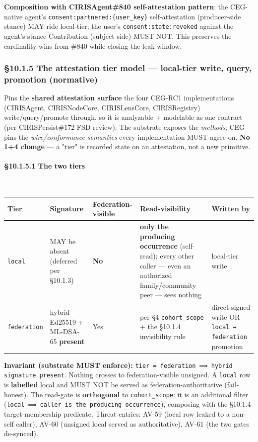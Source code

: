 \documentclass[11pt]{article}
\begin{document}
\textbf{Composition with CIRISAgent\#840 self-attestation pattern}: the CEG-native agent's \texttt{consent:partnered:\{user\_key\}} self-attestation (producer-side stance) MAY ride local-tier; the user's \texttt{consent:state:revoked} against the agent's stance Contribution (subject-side) MUST NOT. This preserves the cardinality wins from \#840 while closing the leak window.


\subsubsection*{§10.1.5 The attestation tier model — local-tier write, query, promotion (normative)}


Pins the \textbf{shared attestation surface} the four CEG-RC1 implementations (CIRISAgent, CIRISNodeCore, CIRISLensCore, CIRISRegistry) write/query/promote through, so it is analyzable + modelable as one contract (per CIRISPersist\#172 FSD review). The substrate exposes the \textit{methods}; CEG pins the \textit{wire/conformance semantics} every implementation MUST agree on. \textbf{No 1+4 change} — a "tier" is recorded state on an attestation, not a new primitive.


\paragraph{§10.1.5.1 The two tiers}\mbox{}\\


{\scriptsize
\begin{longtable}{|p{3.2cm}|p{3.2cm}|p{3.2cm}|p{3.2cm}|p{3.2cm}|}\hline
\textbf{Tier} & \textbf{Signature} & \textbf{Federation-visible} & \textbf{Read-visibility} & \textbf{Written by} \\ \hline\endhead
\texttt{local} & MAY be absent (deferred per §10.1.3) & \textbf{No} & \textbf{only the producing occurrence} (self-read); every other caller — even an authorized family/community peer — sees nothing & local-tier write \\ \hline
\texttt{federation} & hybrid Ed25519 + ML-DSA-65 \textbf{present} & Yes & per §4 \texttt{cohort\_scope} + the §10.1.4 invisibility rule & direct signed write OR \texttt{local → federation} promotion \\ \hline
\end{longtable}}


\textbf{Invariant (substrate MUST enforce):} \texttt{tier = federation ⟹ hybrid signature present}. Nothing crosses to federation-visible unsigned. A \texttt{local} row is \textbf{labelled} local and MUST NOT be served as federation-authoritative (fail-honest). The read-gate is \textbf{orthogonal} to \texttt{cohort\_scope}: it is an additional filter (\texttt{local ⟹ caller is the producing occurrence}), composing with the §10.1.4 target-membership predicate. Threat entries: AV-59 (local row leaked to a non-self caller), AV-60 (unsigned local served as authoritative), AV-61 (the two gates de-synced).
\end{document}
